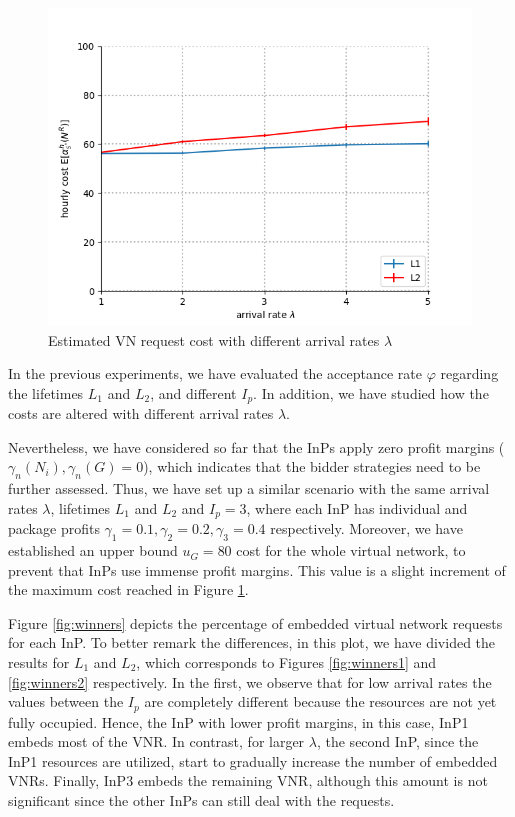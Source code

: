 \begin{figure}[bth]
	\centering
	\includegraphics[scale=0.7]{gfx/ev_pricing.png}    
  	\caption{ Estimated VN request cost with different arrival rates $\lambda$} 
  	\label{fig:pricing}
\end{figure}


In the previous experiments, we have evaluated the acceptance rate $\varphi$ regarding the lifetimes $L_1$ and $L_2$, and different $I_p$. In addition, we have studied how the costs are altered with different arrival rates $\lambda$. 

Nevertheless, we have considered so far that the InPs apply zero profit margins ($\gamma_n(N_i), \gamma_n(G) = 0$), which indicates that the bidder strategies need to be further assessed. Thus, we have set up a similar scenario with the same arrival rates $\lambda$, lifetimes $L_1$ and $L_2$ and $I_p = 3$, where each InP has individual and package profits $\gamma_1 = 0.1, \gamma_2 = 0.2, \gamma_3 = 0.4$ respectively. Moreover, we have established an upper bound $u_G = 80$ cost for the whole virtual network, to prevent that InPs use immense profit margins. This value is a slight increment of the maximum cost reached in Figure \ref{fig:pricing}.

Figure \ref{fig:winners} depicts the percentage of embedded virtual network requests for each InP. To better remark the differences, in this plot, we have divided the results for $L_1$ and $L_2$, which corresponds to Figures \ref{fig:winners1} and \ref{fig:winners2} respectively. In the first, we observe that for low arrival rates the values between the $I_p$ are completely different because the resources are not yet fully occupied. Hence, the InP with lower profit margins, in this case, InP1 embeds most of the VNR. In contrast, for larger $\lambda$, the second InP, since the InP1 resources are utilized, start to gradually increase the number of embedded VNRs. Finally, InP3 embeds the remaining VNR, although this amount is not significant since the other InPs can still deal with the requests.

